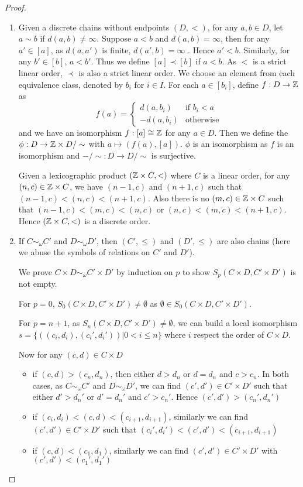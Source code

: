 \documentclass[11pt]{article}
\begin{document}
\begin{proof}
\begin{enumerate}
\item Given a discrete chains without endpoints \((D,<)\), for any \(a,b\in D\), let \(a\sim b\)
if \(d(a,b)\neq\infty\). Suppose \(a< b\) and \(d(a,b)=\infty\), then for
any  \(a'\in[a]\), as \(d(a,a')\) is
finite, \(d(a',b)=\infty\) . Hence \(a'<b\). Similarly, for any \(b'\in[b]\), \(a<b'\). Thus we
define \([a]\prec[b]\) if \(a<b\). As \(<\) is a strict linear order, \(\prec\) is also a strict linear
order. We choose an element from each equivalence class, denoted by \(b_i\) for \(i\in I\). For
each \(a\in[b_i]\), define \(f:D\to\mathbb{Z}\) as
\begin{equation*}
f(a)=
\begin{cases}
d(a,b_i)&\text{if }b_i<a\\
-d(a,b_i)&\text{otherwise}
\end{cases}
\end{equation*}
and we have an isomorphism \(f:[a]\cong\mathbb{Z}\) for any \(a\in D\). Then we define the
\(\phi:D\to\mathbb{Z}\times D/\sim\) with \(a\mapsto(f(a),[a])\). \(\phi\) is an isomorphism as \(f\) is an isomorphism
and \(-/\sim:D\to D/\sim\) is surjective.

Given a lexicographic product \((\mathbb{Z}\times C,<)\) where \(C\) is a linear order, for
any \((n,c)\in\mathbb{Z}\times C\), we have \((n-1,c)\) and \((n+1,c)\) such that \((n-1,c)<(n,c)<(n+1,c)\). Also
there is no \((m,c)\in\mathbb{Z}\times C\) such that \((n-1,c)<(m,c)<(n,c)\) or \((n,c)<(m,c)<(n+1,c)\). Hence
\((\mathbb{Z}\times C,<)\) is a discrete order.

\item If \(C\sim_\omega C'\) and \(D\sim_\omega D'\), then \((C',\le)\) and \((D',\le)\) are also chains (here we abuse the
symbols of relations on \(C'\) and \(D'\)).

We prove \(C\times D\sim_\omega C'\times D'\) by induction on \(p\) to show \(S_p(C\times D,C'\times D')\) is not empty.

For \(p=0\), \(S_0(C\times D,C'\times D')\neq\emptyset\) as \(\emptyset\in S_0(C\times D,C'\times D')\).

For \(p=n+1\), as \(S_n(C\times D,C'\times D')\neq\emptyset\), we can build a local
isomorphism \(s=\{((c_i,d_i),(c_i',d_i'))|0< i\le n\}\) where \(i\) respect the order of \(C\times D\).

Now for any \((c,d)\in C\times D\)
\begin{itemize}
\item if \((c,d)>(c_n,d_n)\), then either \(d>d_n\) or \(d=d_n\) and \(c>c_n\). In both cases,
as \(C\sim_\omega C'\) and \(D\sim_\omega D'\), we can find \((c',d')\in C'\times D'\) such that either \(d'>d_n'\)
or \(d'=d_n'\) and \(c'>c_n'\). Hence \((c',d')>(c_n',d_n')\)
\item if \((c_i,d_i)<(c,d)<(c_{i+1},d_{i+1})\), similarly we can find \((c',d')\in C'\times D'\) such that
\((c_i',d_i')<(c',d')<(c_{i+1},d_{i+1})\)
\item if \((c,d)<(c_1,d_1)\), similarly we can find \((c',d')\in C'\times D'\) with \((c',d')<(c_1',d_1')\)
\end{itemize}
\end{enumerate}



\end{proof}
\end{document}
